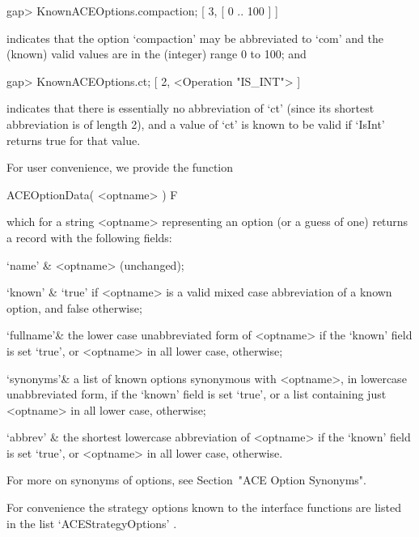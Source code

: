 \beginexample
gap> KnownACEOptions.compaction;
[ 3, [ 0 .. 100 ] ]
\endexample

indicates that the option `compaction' may be  abbreviated  to  `com'
and the (known) valid values are in the (integer) range 0 to 100; and

\beginexample
gap> KnownACEOptions.ct;
[ 2, <Operation "IS_INT"> ]
\endexample

indicates that there is essentially no abbreviation of `ct' (since its
shortest abbreviation is of length 2),  and a value of  `ct' is  known
to be valid if `IsInt' returns true for that value.

\beginitems

For user convenience, we provide the function

\>ACEOptionData( <optname> ) F

which for a string <optname> representing an {\ACE} option (or a guess
of one) returns a record with the following fields:

\beginitems

\quad`name'   & <optname> (unchanged);

\quad`known'  & `true' if <optname> is a valid mixed case abbreviation
of a known {\ACE} option, and false otherwise;

\quad`fullname'& the lower case unabbreviated form of <optname> if the
`known'  field  is  set  `true',  or  <optname>  in  all  lower  case,
otherwise;

\quad`synonyms'& a  list  of  known  {\ACE}  options  synonymous  with
<optname>, in lowercase unabbreviated form, if the  `known'  field  is
set `true', or a list containing just <optname>  in  all  lower  case,
otherwise;

\quad`abbrev' & the shortest lowercase abbreviation  of  <optname>  if
the `known' field is set `true',  or  <optname>  in  all  lower  case,
otherwise.

\enditems

For more on  synonyms  of  {\ACE}  options,  see  Section~"ACE  Option
Synonyms".

\enditems


For convenience the strategy options known  to  the  {\ACE}  interface
functions  are  listed  in  the   {\GAP}   list  `ACEStrategyOptions'%
{\undoquotes{}}.


